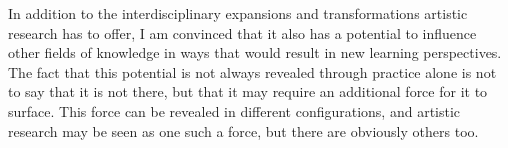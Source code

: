 \documentclass[12pt]{article}
\begin{document}
In addition to the interdisciplinary expansions and transformations artistic research has to offer, I am convinced that it also has a potential to influence other fields of knowledge in ways that would result in new learning perspectives. The fact that this potential is not always revealed through practice alone is not to say that it is not there, but that it may require an additional force for it to surface. This force can be revealed in different configurations, and artistic research may be seen as one such a force, but there are obviously others too. 


\end{document}
